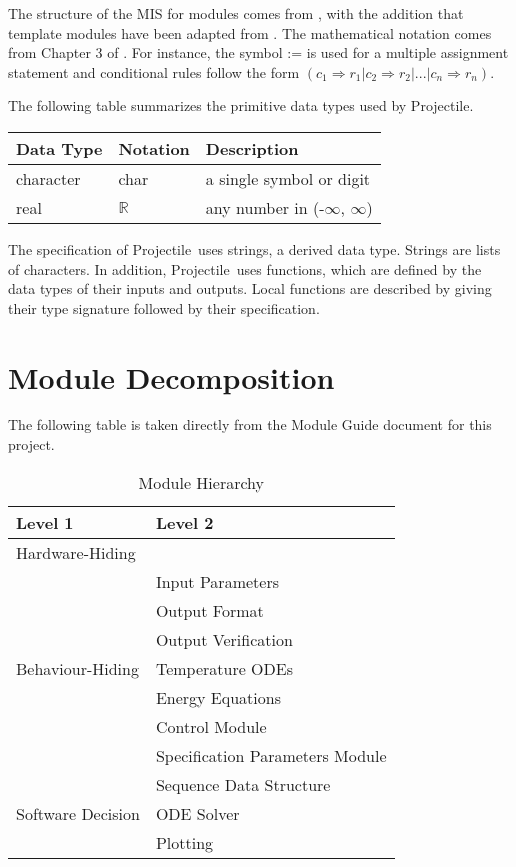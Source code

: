 \documentclass[12pt, titlepage]{article}
\newcommand{\progname}{Projectile}
\begin{document}
The structure of the MIS for modules comes from \citet{HoffmanAndStrooper1995},
with the addition that template modules have been adapted from
\cite{GhezziEtAl2003}.  The mathematical notation comes from Chapter 3 of
\citet{HoffmanAndStrooper1995}.  For instance, the symbol := is used for a
multiple assignment statement and conditional rules follow the form $(c_1
\Rightarrow r_1 | c_2 \Rightarrow r_2 | ... | c_n \Rightarrow r_n )$.

The following table summarizes the primitive data types used by \progname. 

\begin{center}
\renewcommand{\arraystretch}{1.2}
\noindent 
\begin{tabular}{l l p{7.5cm}} 
\toprule 
\textbf{Data Type} & \textbf{Notation} & \textbf{Description}\\ 
\midrule
character & char & a single symbol or digit\\
real & $\mathbb{R}$ & any number in (-$\infty$, $\infty$)\\
\bottomrule
\end{tabular} 
\end{center}

\noindent
The specification of \progname\ uses strings, a derived data type. Strings
are lists of characters. In addition, \progname\ uses functions, which
are defined by the data types of their inputs and outputs. Local functions are
described by giving their type signature followed by their specification.

\section{Module Decomposition}

The following table is taken directly from the Module Guide document for this project.

\begin{table}[h!]
\centering
\begin{tabular}{p{} p{}}
\toprule
\textbf{Level 1} & \textbf{Level 2}\\
\midrule

{Hardware-Hiding} & ~ \\
\midrule

\multirow{7}{0.3\textwidth}{Behaviour-Hiding} & Input Parameters\\
& Output Format\\
& Output Verification\\
& Temperature ODEs\\
& Energy Equations\\ 
& Control Module\\
& Specification Parameters Module\\
\midrule

\multirow{3}{0.3\textwidth}{Software Decision} & {Sequence Data Structure}\\
& ODE Solver\\
& Plotting\\
\bottomrule

\end{tabular}
\caption{Module Hierarchy}
\label{TblMH}
\end{table}
\end{document}
